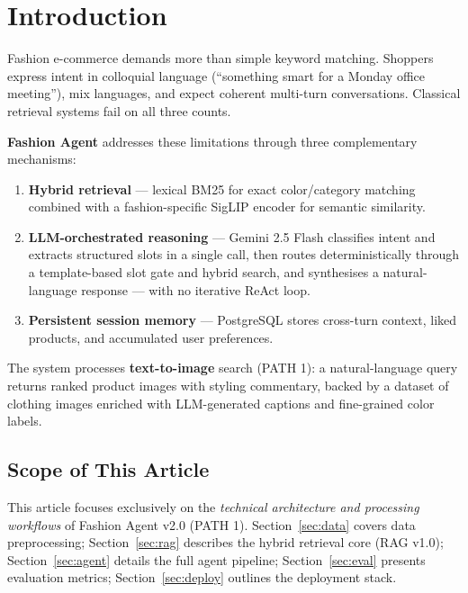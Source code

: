 \documentclass[12pt,a4paper]{article}
\begin{document}
\tableofcontents
\newpage

\section{Introduction}
\label{sec:intro}

Fashion e-commerce demands more than simple keyword matching.
Shoppers express intent in colloquial language
(``something smart for a Monday office meeting''),
mix languages, and expect coherent multi-turn conversations.
Classical retrieval systems fail on all three counts.

\textbf{Fashion Agent} addresses these limitations through three
complementary mechanisms:
\begin{enumerate}[label=(\arabic*)]
  \item \textbf{Hybrid retrieval} --- lexical BM25 for exact color/category matching combined with a fashion-specific SigLIP encoder for semantic similarity.
  \item \textbf{LLM-orchestrated reasoning} --- Gemini 2.5 Flash classifies intent and extracts structured slots in a single call, then routes deterministically through a template-based slot gate and hybrid search, and synthesises a natural-language response --- with no iterative ReAct loop.
  \item \textbf{Persistent session memory} --- PostgreSQL stores cross-turn context, liked products, and accumulated user preferences.
\end{enumerate}

The system processes \textbf{text-to-image} search (PATH 1):
a natural-language query returns ranked product images with
styling commentary, backed by a dataset of clothing images enriched
with LLM-generated captions and fine-grained color labels.

\subsection{Scope of This Article}

This article focuses exclusively on the \emph{technical architecture
and processing workflows} of Fashion Agent v2.0 (PATH 1).
Section~\ref{sec:data} covers data preprocessing;
Section~\ref{sec:rag} describes the hybrid retrieval core (RAG v1.0);
Section~\ref{sec:agent} details the full agent pipeline;
Section~\ref{sec:eval} presents evaluation metrics;
Section~\ref{sec:deploy} outlines the deployment stack.
\end{document}
